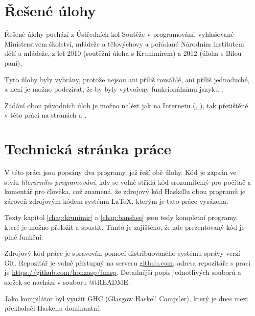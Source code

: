 \section{Řešené úlohy}

Řešené úlohy pochází z Ústředních kol Soutěže v programování, vyhlašované
Ministerstvem školství, mládeže a tělovýchovy a pořádané Národním institutem
dětí a mládeže, z let 2010 (soutěžní úloha s Krunimírem) a 2012 (úloha s Bílou
paní),

Tyto úlohy byly vybrány, protože nejsou ani příliš rozsáhlé, ani příliš
jednoduché, a není je možno podezírat, že by byly vytvořeny funkcionálnímu jazyku
.

Zadání obou původních úloh je možno nalézt jak na Internetu
(\cite{krunimir-task}, \cite{banshee-task}), tak přetištěné v této práci na
stranách \pageref{pdf:krunimir} a \pageref{pdf:banshee}.

\section{Technická stránka práce}

V této práci jsou popsány dva programy, jež řeší obě úlohy. Kód je zapsán ve
stylu \emph{literárního programování}, kdy se volně střídá kód srozumitelný pro
počítač a komentář pro člověka, což znamená, že zdrojový kód Haskellu obou
programů je zároveň zdrojovým kódem systému \LaTeX, kterým je tato práce
vysázena.

Texty kapitol \ref{chap:krunimir} a \ref{chap:banshee} jsou tedy kompletní
programy, které je možno přeložit a spustit. Tímto je zajištěno, že zde
prezentovaný kód je plně funkční.

Zdrojový kód práce je spravován pomocí distribuovaného systému správy verzí Git.
Repozitář je volně přístupný na serveru \href{http://github.com}{github.com},
adresa repozitáře s prací je \url{https://github.com/honzasp/funsp}. Detailnější
popis jednotlivých souborů a složek se nachází v souboru @t{README}.

Jako kompilátor byl využit GHC (Glasgow Haskell Compiler), který je dnes mezi
překladači Haskellu dominantní.
